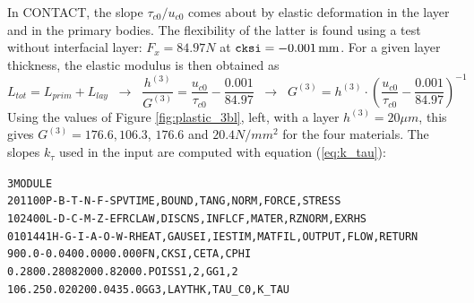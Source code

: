 \documentclass[12pt]{report}
\begin{document}
In CONTACT, the slope $\tau_{c0}/u_{c0}$ comes about by elastic deformation
in the layer and in the primary bodies. The flexibility of the latter is
found using a test without interfacial layer: $F_x=84.97\unit{N}$ at ${\tt
cksi}=-0.001\,\mathrm{mm}$. For a given layer thickness, the elastic modulus is then
obtained as
\begin{equation}
   L_{tot} = L_{prim} + L_{lay}
        \;\;\rightarrow\;\;
   \frac{h^{(3)}}{G^{(3)}} = \frac{u_{c0}}{\tau_{c0}} 
                           - \frac{0.001}{84.97}
        \;\;\rightarrow\;\;
   G^{(3)} = h^{(3)} \cdot \left( \frac{u_{c0}}{\tau_{c0}} 
                           - \frac{0.001}{84.97} \right)^{-1}
\end{equation}
Using the values of Figure \ref{fig:plastic_3bl}, left, with a layer
$h^{(3)}=20\unit{\mu m}$, this gives $G^{(3)}=176.6, 106.3$, $176.6$ and
$20.4\unit{N/mm^2}$ for the four materials. The slopes $k_\tau$ used in the
input are computed with equation (\ref{eq:k_tau}):
\begin{alltt}\small

 3  MODULE
  201100     P-B-T-N-F-S        PVTIME, BOUND , TANG  , NORM , FORCE, STRESS
  102400     L-D-C-M-Z-E        FRCLAW, DISCNS, INFLCF, MATER, RZNORM, EXRHS
 0101441   H-G-I-A-O-W-R  HEAT, GAUSEI, IESTIM, MATFIL, OUTPUT, FLOW, RETURN
   900.0      -0.040       0.000      0.000      FN, CKSI, CETA, CPHI
   0.280       0.280       82000.     82000.     POISS 1,2, GG 1,2
   106.25      0.020       200.0      435.0      GG3, LAYTHK, TAU_C0, K_TAU
\end{alltt}
\end{document}
